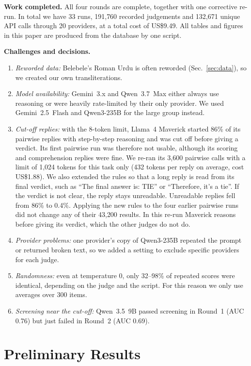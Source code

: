 \documentclass[conference]{IEEEtran}
\begin{document}
\textbf{Work completed.} All four rounds are complete, together with one corrective re-run. In total we have 33 runs,
191{,}760 recorded judgements and 132{,}671 unique API calls through 20 providers, at a total cost of US\$9.49. All
tables and figures in this paper are produced from the database by one script.

\textbf{Challenges and decisions.}
\label{sec:challenges}
\begin{enumerate}
\item \emph{Reworded data:} Belebele's Roman Urdu is often reworded (Sec.~\ref{sec:data}), so we created our own
transliterations.
\item \emph{Model availability:} Gemini~3.x and Qwen~3.7~Max either always use reasoning or were heavily rate-limited by
their only provider. We used Gemini~2.5~Flash and Qwen3-235B for the large group instead.
\item \emph{Cut-off replies:} with the 8-token limit, Llama~4 Maverick started 86\% of its pairwise replies with
step-by-step reasoning and was cut off before giving a verdict. Its first pairwise run was therefore not usable, although
its scoring and comprehension replies were fine. We re-ran its 3{,}600 pairwise calls with a limit of 1{,}024 tokens
for this task only (432 tokens per reply on average, cost US\$1.88). We also extended the rules so that a long reply is
read from its final verdict, such as ``The final answer is: TIE'' or ``Therefore, it's a tie''. If the verdict is not
clear, the reply stays unreadable. Unreadable replies fell from 86\% to 0.4\%. Applying the new rules to the four
earlier pairwise runs did not change any of their 43{,}200 results. In this re-run Maverick reasons before giving its
verdict, which the other judges do not do.
\item \emph{Provider problems:} one provider's copy of Qwen3-235B repeated the prompt or returned broken text, so we
added a setting to exclude specific providers for each judge.
\item \emph{Randomness:} even at temperature 0, only 32--98\% of repeated scores were identical, depending on the
judge and the script. For this reason we only use averages over 300 items.
\item \emph{Screening near the cut-off:} Qwen~3.5~9B passed screening in Round~1 (AUC 0.76) but just failed in Round~2
(AUC 0.69).
\end{enumerate}

\section{Preliminary Results}
\label{sec:results}

\end{document}
